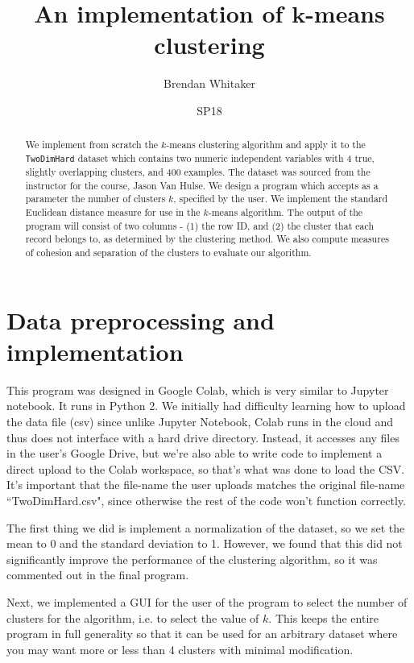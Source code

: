 \documentclass[12pt,oneside,reqno]{amsart}
\theoremstyle{plain}
\theoremstyle{definition}
\theoremstyle{remark}
\newcommand{\bb}{\vspace{3mm}}
\newcommand{\inlinecode}{\texttt}
\begin{document}
\begin{abstract}
We implement from scratch the $k$-means clustering algorithm and apply it to the \inlinecode{TwoDimHard} dataset which contains two numeric 
independent variables with 4 true, slightly 
overlapping clusters, and 400 examples. The dataset was sourced from the instructor for the course, Jason Van Hulse. We design a program which accepts as a parameter the number of clusters $k$, specified by the 
user. We implement the standard Euclidean distance measure for use in the $k$-means algorithm. The output of the program will consist of two columns - (1) the row ID, and (2) the 
cluster that each record belongs to, as determined by the clustering method. We also compute measures of cohesion and separation of the clusters to evaluate our algorithm. 
\end{abstract}
\title{An implementation of $\mathbf{k}$-means clustering}
\date{SP18}
\author[Brendan Whitaker]{Brendan Whitaker}
\maketitle
\tableofcontents


\section{Data preprocessing and implementation}

This program was designed in Google Colab, which is very similar to Jupyter notebook. It runs in Python 2. We initially had difficulty learning how to upload the data file (csv) since unlike Jupyter Notebook, Colab runs in the cloud and thus does not interface with a hard drive directory. Instead, it accesses any files in the user's Google Drive, but we're also able to write code to implement a direct upload to the Colab workspace, so that's what was done to load the CSV. It's important that the file-name the user uploads matches the original file-name ``TwoDimHard.csv", since otherwise the rest of the code won't function correctly. 

\bb

The first thing we did is implement a normalization of the dataset, so we set the mean to 0 and the standard deviation to 1. However, we found that this did not significantly improve the performance of the clustering algorithm, so it was commented out in the final program. 

\bb

Next, we implemented a GUI for the user of the program to select the number of clusters for the algorithm, i.e. to select the value of $k$. This keeps the entire program in full generality so that it can be used for an arbitrary dataset where you may want more or less than 4 clusters with minimal modification. 
\end{document}

